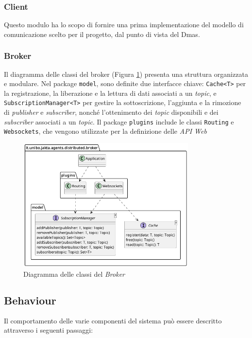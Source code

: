 \subsubsection{Client}
Questo modulo ha lo scopo di fornire una prima implementazione del modello di comunicazione scelto per il progetto, dal punto di vista del Dmas.

\subsubsection{Broker}

Il diagramma delle classi del broker (Figura \ref{fig:broker-class-diagram}) presenta una struttura organizzata e modulare. Nel package \texttt{model}, sono definite due interfacce chiave: \texttt{Cache<T>} per la registrazione, la liberazione e la lettura di dati associati a un \textit{topic}, e \texttt{SubscriptionManager<T>} per gestire la sottoscrizione, l'aggiunta e la rimozione di \textit{publisher} e \textit{subscriber}, nonché l'ottenimento dei \textit{topic} disponibili e dei \textit{subscriber} associati a un \textit{topic}. Il package \texttt{plugins} include le classi \texttt{Routing} e \texttt{Websockets}, che vengono utilizzate per la definizione delle \textit{API Web}

\begin{figure}[ht!]
    \centering
    \includegraphics[width=0.8\textwidth]{figures/broker-class-diagram.png}
    \caption{Diagramma delle classi del \textit{Broker}}
    \label{fig:broker-class-diagram}
\end{figure}

\subsection{Behaviour}
Il comportamento delle varie componenti del sistema può essere descritto attraverso i seguenti passaggi:

